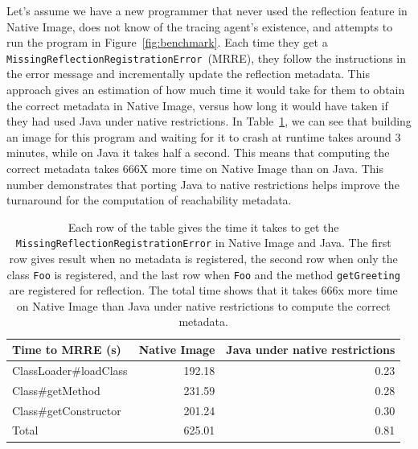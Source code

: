 Let's assume we have a new programmer that never used the reflection feature in Native Image, does not know of the tracing agent's existence, and attempts to run the program in Figure~\ref{fig:benchmark}. Each time they get a \verb|MissingReflectionRegistrationError|~(MRRE), they follow the instructions in the error message and incrementally update the reflection metadata.
This approach gives an estimation of how much time it would take for them to obtain the correct metadata in Native Image, versus how long it would have taken if they had used Java under native restrictions. 
In Table~\ref{tab:benchmark}, we can see that building an image for this program and waiting for it to crash at runtime takes around 3 minutes, while on Java it takes half a second. This means that computing the correct metadata takes 666X more time on Native Image than on Java.
This number demonstrates that porting Java to native restrictions helps improve the turnaround for the computation of reachability metadata.

\begin{table}[ht]
\centering
\begin{tabular}{@{}lrr@{}}
\toprule
Time to MRRE (s) & \multicolumn{1}{l}{Native Image} & \multicolumn{1}{l}{Java under native restrictions} \\ \midrule
ClassLoader\#loadClass          & 192.18 & 0.23 \\
Class\#getMethod                & 231.59 & 0.28 \\
Class\#getConstructor           & 201.24 & 0.30 \\ \midrule
Total                           & 625.01 & 0.81 \\ \bottomrule
\end{tabular}
\caption{Each row of the table gives the time it takes to get the \texttt{MissingReflectionRegistrationError} in Native Image and Java. The first row gives result when no metadata is registered, the second row when only the class \texttt{Foo} is registered, and the last row when \texttt{Foo} and the method \texttt{getGreeting} are registered for reflection. The total time shows that it takes 666x more time on Native Image than Java under native restrictions to compute the correct metadata.}
\label{tab:benchmark}
\end{table}


